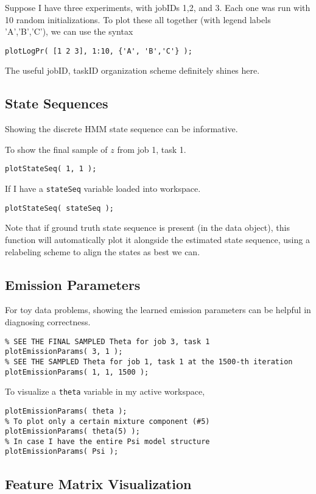\documentclass[fontsize=12]{article}
\begin{document}
Suppose I have three experiments, with jobIDs 1,2, and 3.  Each one was run with 10 random initializations.  To plot these all together (with legend labels 'A','B','C'), we can use the syntax
\begin{verbatim}
plotLogPr( [1 2 3], 1:10, {'A', 'B','C'} );
\end{verbatim}

The useful jobID, taskID organization scheme definitely shines here.

\subsection{ State Sequences }

Showing the discrete HMM state sequence can be informative. 

To show the final sample of $z$ from job 1, task 1.

\texttt{plotStateSeq( 1, 1 ); }

If I have a \texttt{stateSeq} variable loaded into workspace.

\texttt{plotStateSeq( stateSeq ); }

Note that if ground truth state sequence is present (in the data object), this function will automatically plot it alongside the estimated state sequence, using a relabeling scheme to align the states as best we can.

\subsection{Emission Parameters}

For toy data problems, showing the learned emission parameters can be helpful in diagnosing correctness. 

\begin{verbatim}
% SEE THE FINAL SAMPLED Theta for job 3, task 1
plotEmissionParams( 3, 1 );
% SEE THE SAMPLED Theta for job 1, task 1 at the 1500-th iteration
plotEmissionParams( 1, 1, 1500 );
\end{verbatim}

To visualize a \texttt{theta} variable in my active workspace,

\begin{verbatim}
plotEmissionParams( theta );
% To plot only a certain mixture component (#5)
plotEmissionParams( theta(5) );
% In case I have the entire Psi model structure
plotEmissionParams( Psi );
\end{verbatim}

\subsection{Feature Matrix Visualization}
\end{document}
